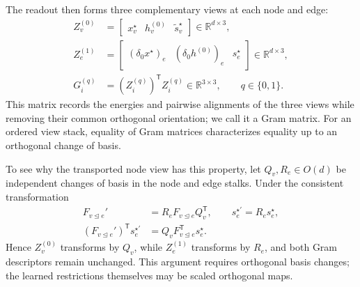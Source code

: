 \documentclass[sigconf,anonymous,review]{acmart}
\newcommand{\R}{\mathbb{R}}
\newcommand{\transpose}{\mathsf{T}}
\begin{document}
The readout then forms three complementary views at each node and edge:
\begin{equation}
  \begin{aligned}
  Z_v^{(0)}
  &=\begin{bmatrix}x_v^\star&h_v^{(0)}&\widetilde{s}_v^\star\end{bmatrix}
    \in\R^{d\times3},\\
  Z_e^{(1)}
  &=\begin{bmatrix}
    (\delta_0x^\star)_e&(\delta_0h^{(0)})_e&s_e^\star
  \end{bmatrix}
    \in\R^{d\times3},\\
   G_i^{(q)}
   &=(Z_i^{(q)})^{\transpose}Z_i^{(q)}
     \in\R^{3\times3},\qquad q\in\{0,1\}.
  \end{aligned}
  \label{eq:pool-views}
\end{equation}
This matrix records the energies and pairwise alignments of the three views while removing their
common orthogonal orientation; we call it a Gram matrix. For an ordered view stack, equality of Gram matrices
characterizes equality up to an orthogonal change of basis.

To see why the transported node view has this property, let \(Q_v,R_e\in O(d)\) be independent
changes of basis in the node and edge stalks. Under the consistent transformation
\begin{equation}
  \begin{aligned}
  F_{v\unlhd e}'&=R_eF_{v\unlhd e}Q_v^{\transpose},
  \qquad s_e^{\star\prime}=R_es_e^\star,\\
  (F_{v\unlhd e}')^{\transpose}s_e^{\star\prime}
  &=Q_vF_{v\unlhd e}^{\transpose}s_e^\star .
  \end{aligned}
  \label{eq:pool-gauge}
\end{equation}
Hence \(Z_v^{(0)}\) transforms by \(Q_v\), while \(Z_e^{(1)}\) transforms by \(R_e\), and both Gram
descriptors remain unchanged. This argument requires orthogonal basis changes; the learned
restrictions themselves may be scaled orthogonal maps.
\end{document}
